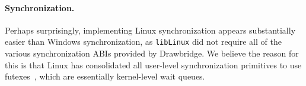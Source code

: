 \paragraph{Synchronization.} Perhaps surprisingly, implementing Linux
synchronization appears substantially easier than Windows synchronization, 
as {\tt libLinux} did not require all of the various
synchronization ABIs provided by Drawbridge.
We believe the reason for this is that Linux has consolidated 
all user-level synchronization primitives to use futexes~\citep{franke02futex},
which are essentially kernel-level wait queues.

%


